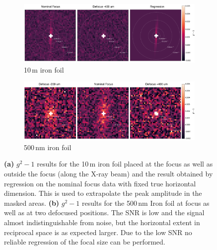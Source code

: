 \begin{figure}
	\centering
	\begin{subfigure}[b]{0.95\textwidth}
		\includegraphics[width=\linewidth]{images/Fe10um_reco2d.pdf}
		\caption{10\,\textmu m iron foil}
		\label{fig:fe10umreco2d}
	\end{subfigure}
	\begin{subfigure}[b]{0.95\textwidth}
		\includegraphics[width=\linewidth]{images/Fe500nm_reco2d.pdf}
		\caption{500\,nm iron foil}
		\label{fig:fe500nmreco2d}
	\end{subfigure}
	\caption[Results iron foils]{\textbf{(a)} $g^2-1$ results for the 10\,\textmu m iron foil placed at the focus as well as outside the focus (along the X-ray beam) and the result obtained by regression on the nominal focus data with fixed true horizontal dimension. This is used to extrapolate the peak amplitude in the masked areas. \textbf{(b)} $g^2-1$ results for the 500\,nm Iron foil at focus as well as at two defocused positions. The SNR is low and the signal almost indistinguishable from noise, but the horizontal extent in reciprocal space is as expected larger. Due to the low SNR no reliable regression of the focal size can be performed.}
	\label{fig:fereco2d}
\end{figure}
